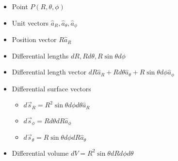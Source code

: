 \documentclass[12pt]{article}
\begin{document}
\begin{itemize}
	\item Point $P(R,\theta,\phi)$
	\item Unit vectors $\hat{a}_R,\hat{a}_\theta,\hat{a}_\phi$
	\item Position vector $R\hat{a}_R$
	\item Differential lengths $dR, Rd\theta, R\sin\theta d\phi$
	\item Differential length vector $dR\hat{a}_R + Rd\theta\hat{a}_\theta + R\sin\theta d\phi\hat{a}_\phi$
	\item Differential surface vectors
		\begin{itemize}
			\item $d\vec{s}_R = R^2\sin\theta d\phi d\theta \hat{a}_R$
			\item $d\vec{s}_\phi = Rd\theta dR\hat{a}_\phi$
			\item $d\vec{s}_\theta = R\sin\theta d\phi dR\hat{a}_\theta$
		\end{itemize}
	\item Differential volume $dV = R^2\sin\theta dRd\phi d\theta$
\end{itemize}
\end{document}
